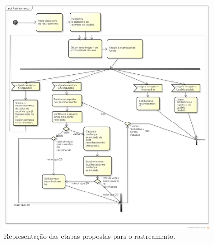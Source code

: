	\begin{figure}[H]
		\begin{center}
			\includegraphics[scale=0.45]{figuras/4.ProblemaEProposta/Rastreamento.png}
		\end{center}
		\caption{Representação das etapas propostas para o rastreamento.}
		\label{fig:processo-rastreamento}
	\end{figure}
